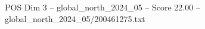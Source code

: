 \begin{textsample}{POS Dim 3 – global\_north\_2024\_05 – Score 22.00 – global\_north\_2024\_05/200461275.txt}
\end{textsample}
